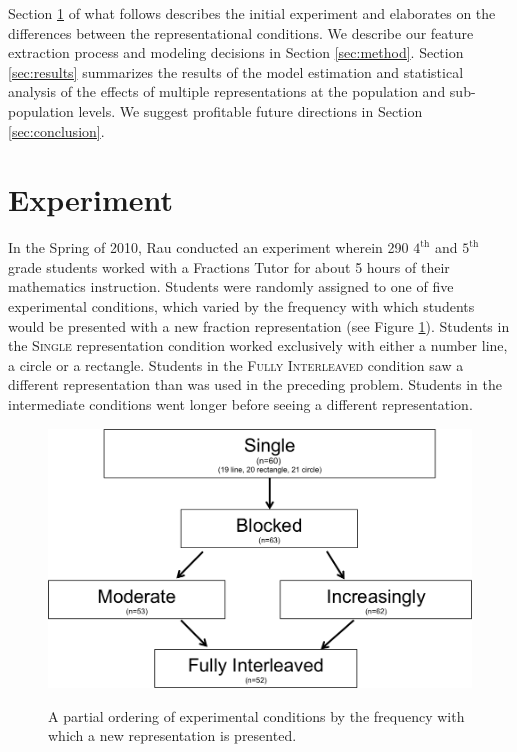 \documentclass{edm_template}
\newcommand{\mgr}[1]{\textsc{#1}}
\begin{document}
Section \ref{sec:experiment} of what follows describes the initial experiment and elaborates on the differences between the representational conditions. We describe our feature extraction process and modeling decisions in Section \ref{sec:method}. Section \ref{sec:results} summarizes the results of the model estimation and statistical analysis of the effects of multiple representations at the population and sub-population levels. We  suggest profitable future directions in Section \ref{sec:conclusion}.

\section{Experiment}
\label{sec:experiment}

In the Spring of 2010, Rau conducted an experiment wherein 290 $4^\text{th}$ and $5^\text{th}$ grade students worked with a Fractions Tutor for about 5 hours of their mathematics instruction. Students were randomly assigned to one of five experimental conditions, which varied by the frequency with which students would be presented with a new fraction representation (see Figure \ref{fig:condition-graph}). Students in the \mgr{Single} representation condition worked exclusively with either a number line, a circle or a rectangle. Students in the \mgr{Fully Interleaved} condition saw a different representation than was used in the preceding problem. Students in the intermediate conditions went longer before seeing a different representation.   
\begin{figure}[htbp]
\centering
\includegraphics[scale=.4]{conditionGraph.png}\\
\caption{A partial ordering of experimental conditions by the frequency with which a new representation is presented. }
\label{fig:condition-graph}
\end{figure}
\end{document}
